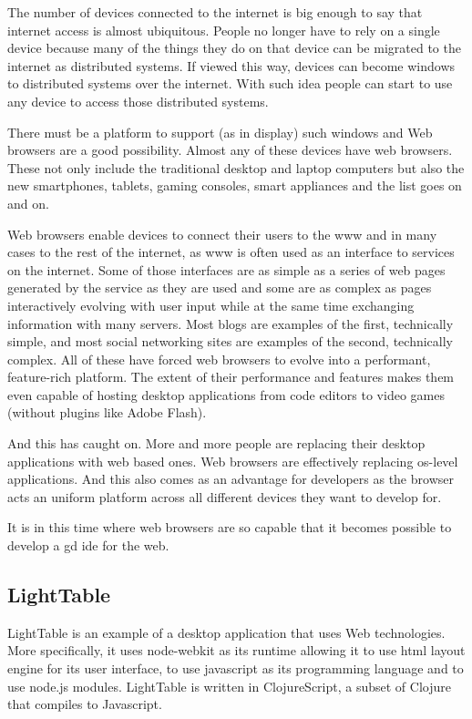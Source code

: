 \documentclass{./llncs2e/llncs}
\begin{document}
	The number of devices connected to the internet is big enough to say that internet access is almost ubiquitous.
	People no longer have to rely on a single device because many of the things they do on that device can be migrated to the internet as distributed systems.
	If viewed this way, devices can become windows to distributed systems over the internet.
	With such idea people can start to use any device to access those distributed systems.

	There must be a platform to support (as in display) such windows and Web browsers are a good possibility.
	Almost any of these devices have web browsers.
	These not only include the traditional desktop and laptop computers but also the new smartphones, tablets, gaming consoles, smart appliances and the list goes on and on.

	Web browsers enable devices to connect their users to the \ac{www} and in many cases to the rest of the internet, as \ac{www} is often used as an interface to services on the internet.
	Some of those interfaces are as simple as a series of web pages generated by the service as they are used and some are as complex as pages interactively evolving with user input while at the same time exchanging information with many servers.
	Most blogs are examples of the first, technically simple, and most social networking sites are examples of the second, technically complex.
	All of these have forced web browsers to evolve into a performant, feature-rich platform.
	The extent of their performance and features makes them even capable of hosting desktop applications from code editors to video games (without plugins like Adobe Flash).

	And this has caught on.
	More and more people are replacing their desktop applications with web based ones.
	Web browsers are effectively replacing \ac{os}-level applications.
	And this also comes as an advantage for developers as the browser acts an uniform platform across all different devices they want to develop for.

	It is in this time where web browsers are so capable that it becomes possible to develop a \ac{gd} \ac{ide} for the web.

\subsection{LightTable}
	LightTable is an example of a desktop application that uses Web technologies.
	More specifically, it uses node-webkit as its runtime allowing it to use html layout engine for its user interface, to use javascript as its programming language and to use node.js\cite{tilkov2010node} modules.
	LightTable is written in ClojureScript\cite{10.1109/MIC.2011.148}, a subset of Clojure that compiles to Javascript.
\end{document}
